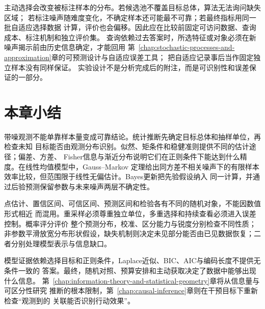 主动选择会改变被标注样本的分布。若候选池不覆盖目标总体，算法无法询问缺失区域；
若标注噪声随难度变化，不确定样本还可能最不可靠；若最终指标用同一批自适应选择数据
计算，评价也会偏移。因此应在比较前固定可访问数据、查询成本、标注机制和独立评价集。
查询依赖过去答案时，所选特征或对象必须在新噪声揭示前由历史信息确定，才能回用
第~\ref{chap:stochastic-processes-and-approximation}章的可预测设计与自适应误差工具；
把自适应记录事后当作固定独立样本没有同样保证。
实验设计不是分析完成后的附注，而是可识别性和误差保证的一部分。

\section{本章小结}
\label{sec:statistics-summary}

带噪观测不能单靠样本量变成可靠结论。统计推断先确定目标总体和抽样单位，再检查未知
目标能否由观测分布识别。似然、矩条件和稳健准则提供不同的估计途径；偏差、方差、
Fisher信息与渐近分布说明它们在正则条件下能达到什么精度。在线性均值模型中，Gauss--Markov
定理给出同方差不相关噪声下的有限样本效率比较，但范围限于线性无偏估计。Bayes更新把先验假设纳入
同一计算，并通过后验预测保留参数与未来噪声两层不确定性。

点估计、置信区间、可信区间、预测区间和检验各有不同的随机对象，不能因数值形式相近
而混用。重采样必须尊重独立单位，多重选择和持续查看必须进入误差控制。概率评分评价
整个预测分布，校准、区分能力与锐度分别检查不同性质；非参数平滑放宽分布形状假设，缺失机制则决定未见部分能否由已见数据恢复；二者分别处理模型表示与信息缺口。

模型证据依赖选择目标和正则条件，Laplace近似、BIC、AIC与编码长度不提供无条件一致的
答案。最终，随机对照、预算安排和主动获取决定了数据中能够出现什么信息。
第~\ref{chap:information-theory-and-statistical-geometry}章将从信息量与可区分性研究
推断的根本限制，第~\ref{chap:causal-inference}章则在干预目标下重新检查“观测到的
关联能否识别行动效果”。
